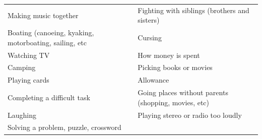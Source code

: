 \documentclass[]{book}
\begin{document}
\begin{longtable}[]{@{}ll@{}}
\begin{minipage}[t]{0.50\columnwidth}
Making music together\strut
\end{minipage} & \begin{minipage}[t]{0.44\columnwidth}\raggedright
Fighting with siblings (brothers and sisters)\strut
\end{minipage}\tabularnewline
\begin{minipage}[t]{0.50\columnwidth}\raggedright
Boating (canoeing, kyaking, motorboating, sailing, etc\strut
\end{minipage} & \begin{minipage}[t]{0.44\columnwidth}\raggedright
Cursing\strut
\end{minipage}\tabularnewline
\begin{minipage}[t]{0.50\columnwidth}\raggedright
Watching TV\strut
\end{minipage} & \begin{minipage}[t]{0.44\columnwidth}\raggedright
How money is spent\strut
\end{minipage}\tabularnewline
\begin{minipage}[t]{0.50\columnwidth}\raggedright
Camping\strut
\end{minipage} & \begin{minipage}[t]{0.44\columnwidth}\raggedright
Picking books or movies\strut
\end{minipage}\tabularnewline
\begin{minipage}[t]{0.50\columnwidth}\raggedright
Playing cards\strut
\end{minipage} & \begin{minipage}[t]{0.44\columnwidth}\raggedright
Allowance\strut
\end{minipage}\tabularnewline
\begin{minipage}[t]{0.50\columnwidth}\raggedright
Completing a difficult task\strut
\end{minipage} & \begin{minipage}[t]{0.44\columnwidth}\raggedright
Going places without parents (shopping, movies, etc)\strut
\end{minipage}\tabularnewline
\begin{minipage}[t]{0.50\columnwidth}\raggedright
Laughing\strut
\end{minipage} & \begin{minipage}[t]{0.44\columnwidth}\raggedright
Playing stereo or radio too loudly\strut
\end{minipage}\tabularnewline
\begin{minipage}[t]{0.50\columnwidth}\raggedright
Solving a problem, puzzle, crossword\strut

\end{minipage}
\end{longtable}
\end{document}
